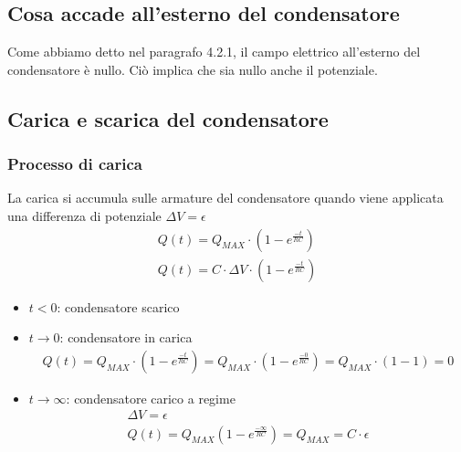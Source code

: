 \subsection{Cosa accade all'esterno del condensatore}
Come abbiamo detto nel paragrafo 4.2.1, il campo elettrico all'esterno del condensatore è nullo. Ciò implica che sia nullo anche il potenziale.

\subsection{Carica e scarica del condensatore}
\subsubsection{Processo di carica}
La carica si accumula sulle armature del condensatore quando viene applicata una differenza di potenziale $\Delta V = \epsilon$
\begin{displaymath}\begin{aligned}
	Q(t) = Q_{MAX} \cdot (1- e^{\frac{-t}{RC}})\\
    Q(t) = C \cdot \Delta V \cdot (1- e^{\frac{-t}{RC}})
\end{aligned}\end{displaymath}
\begin{itemize}
	\item{$t < 0$: condensatore scarico}
    \item{$t \rightarrow 0$: condensatore in carica 
    	\begin{displaymath}\begin{aligned}
            Q(t) = Q_{MAX} \cdot (1- e^{\frac{-t}{RC}}) = 
            Q_{MAX} \cdot (1- e^{\frac{-0}{RC}}) = 
            Q_{MAX} \cdot (1- 1) = 0
    	\end{aligned}\end{displaymath}}
    \item{$t \rightarrow \infty$: condensatore carico a regime
      \begin{displaymath}\begin{aligned}
              \Delta V = \epsilon\\
              Q(t) = Q_{MAX} (1- e^{\frac{-\infty}{RC}}) = 
              Q_{MAX} = C \cdot \epsilon
          \end{aligned}\end{displaymath}}
\end{itemize}

